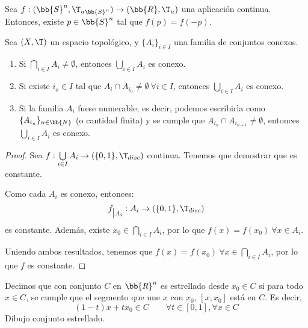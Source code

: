 \begin{teo}
    Sea $f:(\bb{S}^n, {\T_u}_{\bb{S}^n})\to (\bb{R}, \T_u)$ una aplicación continua. Entonces, existe $p\in \bb{S}^n$ tal que $f(p)=f(-p)$.
\end{teo}



\begin{prop}
    Sea $(X,\T)$ un espacio topológico, y $\{A_i\}_{i\in I}$ una familia de conjuntos conexos.
    \begin{enumerate}
        \item Si $\bigcap\limits_{i\in I}A_i\neq \emptyset$, entonces $\bigcup\limits_{i\in I}A_i$ es conexo.
        \item Si existe $i_o\in I$ tal que $A_i\cap A_{i_0}\neq \emptyset~ \forall i\in I$, entonces $\bigcup\limits_{i\in I}A_i$ es conexo.
        \item Si la familia $A_i$ fuese numerable; es decir, podemos escribirla como $\{A_{i_n}\}_{n\in \bb{N}}$ (o cantidad finita) y se cumple que $A_{i_n}\cap A_{i_{n+1}}\neq \emptyset$, entonces $\bigcup\limits_{i\in I}A_i$ es conexo.
    \end{enumerate}
\end{prop}
\begin{proof}
    Sea $f:\bigcup\limits_{i\in I}A_i \to (\{0,1\}, \T_{disc})$ continua. Tenemos que demostrar que es constante.

    Como cada $A_i$ es conexo, entonces:
    \begin{equation*}
        f_{\big |A_i}:A_i\to (\{0,1\}, \T_{disc})
    \end{equation*}
    es constante. Además, existe $x_0\in \bigcap\limits_{i\in I}A_i$, por lo que $f(x)=f(x_0)~ \forall x\in A_i$.

    Uniendo ambos resultados, tenemos que $f(x)=f(x_0)~\forall x\in \bigcap\limits_{i\in I}A_i$, por lo que $f$ es constante.
\end{proof}

\begin{definicion}
    Decimos que con conjunto $C$ en $\bb{R}^n$ es estrellado desde $x_0\in C$ si para todo $x\in C$, se cumple que el segmento que une $x$ con $x_0$, $[x,x_0]$ está en $C$. Es decir,
    \begin{equation*}
        (1-t)x + tx_0 \in C  \qquad \forall t\in [0,1],\forall x\in C
    \end{equation*}
    Dibujo conjunto estrellado.
\end{definicion}

